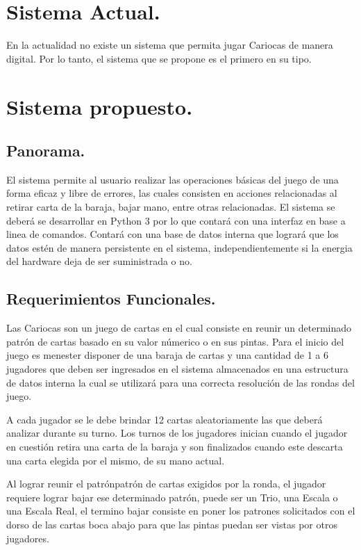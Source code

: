 \documentclass[60pt]{article}
\begin{document}
\section{Sistema Actual.}\label{cap:sistemaActual}
En la actualidad no existe un sistema que permita jugar Cariocas de manera digital. Por lo tanto, el sistema que se propone es el primero en su tipo.
\section{Sistema propuesto.}\label{cap:sistema}
\subsection{Panorama.}\label{cap:panorama}
El sistema permite al usuario realizar las operaciones básicas del juego de una forma eficaz y libre de errores, las cuales consisten en acciones relacionadas al retirar carta de la \gls{baraja}, bajar mano, entre otras relacionadas. El sistema se deberá se desarrollar en Python 3 por lo que contará con una interfaz en base a linea de comandos. Contará con una base de datos interna que logrará que los datos estén de manera persistente en el sistema, independientemente si la energia del hardware deja de ser suministrada o no.
\subsection{Requerimientos Funcionales.}\label{cap:requerimientos-funcionales}
Las Cariocas son un juego de cartas en el cual consiste en reunir un determinado \gls{patrón} de cartas basado en su valor númerico o en sus pintas. Para el inicio del juego es menester disponer de una \gls{baraja} de cartas y una cantidad de 1 a 6 jugadores que deben ser ingresados en el sistema almacenados en una estructura de datos interna la cual se utilizará para una correcta resolución de las rondas del juego. 

A cada jugador se le debe brindar 12 cartas aleatoriamente las que deberá analizar durante su turno. Los turnos de los jugadores inician cuando el jugador en cuestión retira una carta de la \gls{baraja} y son finalizados cuando este descarta una carta elegida por el mismo, de su mano actual.

Al lograr reunir el patrón\Gls{patrón} de cartas exigidos por la ronda, el jugador requiere lograr bajar ese determinado \gls{patrón}, puede ser un Trio, una Escala o una Escala Real, el termino bajar consiste en poner los patrones solicitados con el dorso de las cartas boca abajo para que las pintas puedan ser vistas por otros jugadores.
\end{document}
